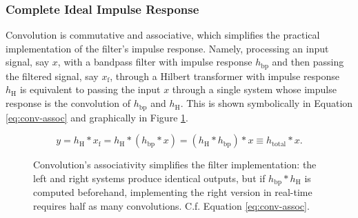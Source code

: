 \subsubsection{Complete Ideal Impulse Response}
Convolution is commutative and associative, which simplifies the practical implementation of the filter's impulse response.
Namely, processing an input signal, say $ x $, with a bandpass filter with impulse response $ h_{\mathrm{bp}} $ and then passing the filtered signal, say $ x_{\mathrm{f}} $, through a Hilbert transformer with impulse response $ h_{\mathrm{H}} $ is equivalent to passing the input $ x $ through a single system whose impulse response is the convolution of $ h_{\mathrm{bp}} $ and $ h_{\mathrm{H}} $.
This is shown symbolically in Equation \ref{eq:conv-assoc} and graphically in Figure \ref{fig:conv-assoc}.

\begin{equation}
    y = h_{\mathrm{H}} * x_{\mathrm{f}} = h_{\mathrm{H}} * ( h_{\mathrm{bp}} * x ) = (h_{\mathrm{H}} * h_{\mathrm{bp}}) * x \equiv h_{\mathrm{total}} * x. \label{eq:conv-assoc}
\end{equation}
\begin{figure}[htb!]
    \centering
        \caption{Convolution's associativity simplifies the filter implementation: the left and right systems produce identical outputs, but if $ h_{\mathrm{bp}}*h_{\mathrm{H}} $ is computed beforehand, implementing the right version in real-time requires half as many convolutions.
        C.f. Equation \ref{eq:conv-assoc}.}
        \label{fig:conv-assoc}
\end{figure}

